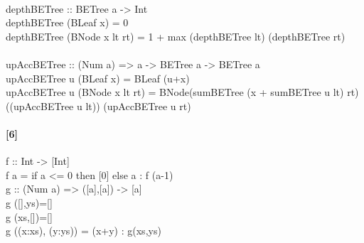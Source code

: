 \documentclass[20 pts]{article}
\begin{document}
\paragraph{}
depthBETree :: BETree a -> Int\\
depthBETree (BLeaf x) = 0 \\
depthBETree (BNode x lt rt) = 1 + max (depthBETree lt) (depthBETree rt)\\
\paragraph{}

upAccBETree :: (Num a) => a -> BETree a -> BETree a\\
upAccBETree u (BLeaf x) = BLeaf (u+x)\\
upAccBETree u (BNode x lt rt) = BNode(sumBETree (x + sumBETree u lt) rt) ((upAccBETree u lt)) (upAccBETree u rt)\\
\newpage
\paragraph{[6]}
               
               
               f :: Int -> [Int]\\
f a = if a <= 0 then [0] else a : f (a-1)\\

g :: (Num a) => ([a],[a]) -> [a]\\
g ([],ys)=[]\\
g (xs,[])=[]\\
g ((x:xs), (y:ys)) = (x+y) : g(xs,ys)\\
\end{document}
